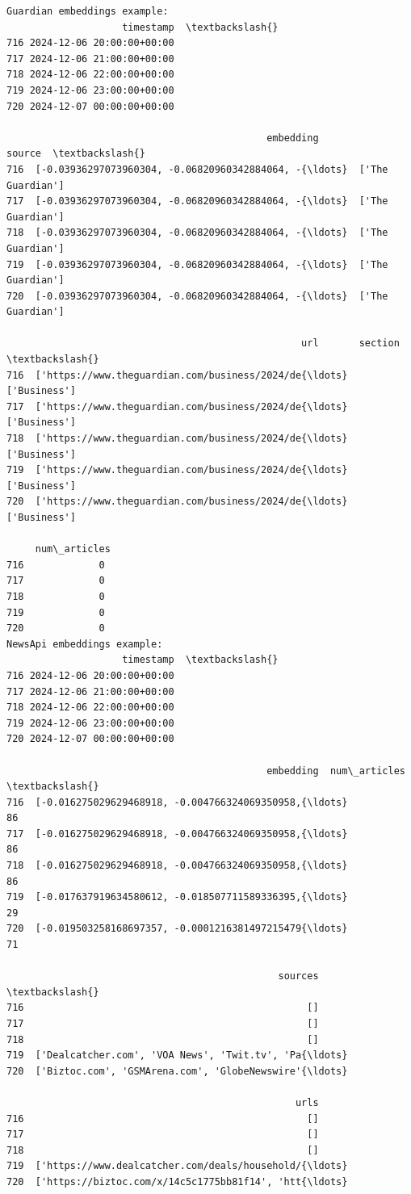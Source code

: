\documentclass[a4paper]{article}
\begin{document}
    \begin{small}
\begin{Verbatim}[commandchars=\\\{\}]
Guardian embeddings example:
                    timestamp  \textbackslash{}
716 2024-12-06 20:00:00+00:00
717 2024-12-06 21:00:00+00:00
718 2024-12-06 22:00:00+00:00
719 2024-12-06 23:00:00+00:00
720 2024-12-07 00:00:00+00:00

                                             embedding            source  \textbackslash{}
716  [-0.03936297073960304, -0.06820960342884064, -{\ldots}  ['The Guardian']
717  [-0.03936297073960304, -0.06820960342884064, -{\ldots}  ['The Guardian']
718  [-0.03936297073960304, -0.06820960342884064, -{\ldots}  ['The Guardian']
719  [-0.03936297073960304, -0.06820960342884064, -{\ldots}  ['The Guardian']
720  [-0.03936297073960304, -0.06820960342884064, -{\ldots}  ['The Guardian']

                                                   url       section  \textbackslash{}
716  ['https://www.theguardian.com/business/2024/de{\ldots}  ['Business']
717  ['https://www.theguardian.com/business/2024/de{\ldots}  ['Business']
718  ['https://www.theguardian.com/business/2024/de{\ldots}  ['Business']
719  ['https://www.theguardian.com/business/2024/de{\ldots}  ['Business']
720  ['https://www.theguardian.com/business/2024/de{\ldots}  ['Business']

     num\_articles
716             0
717             0
718             0
719             0
720             0
NewsApi embeddings example:
                    timestamp  \textbackslash{}
716 2024-12-06 20:00:00+00:00
717 2024-12-06 21:00:00+00:00
718 2024-12-06 22:00:00+00:00
719 2024-12-06 23:00:00+00:00
720 2024-12-07 00:00:00+00:00

                                             embedding  num\_articles  \textbackslash{}
716  [-0.016275029629468918, -0.004766324069350958,{\ldots}            86
717  [-0.016275029629468918, -0.004766324069350958,{\ldots}            86
718  [-0.016275029629468918, -0.004766324069350958,{\ldots}            86
719  [-0.017637919634580612, -0.018507711589336395,{\ldots}            29
720  [-0.019503258168697357, -0.0001216381497215479{\ldots}            71

                                               sources  \textbackslash{}
716                                                 []
717                                                 []
718                                                 []
719  ['Dealcatcher.com', 'VOA News', 'Twit.tv', 'Pa{\ldots}
720  ['Biztoc.com', 'GSMArena.com', 'GlobeNewswire'{\ldots}

                                                  urls
716                                                 []
717                                                 []
718                                                 []
719  ['https://www.dealcatcher.com/deals/household/{\ldots}
720  ['https://biztoc.com/x/14c5c1775bb81f14', 'htt{\ldots}
    \end{Verbatim}
\end{small}
\end{document}
